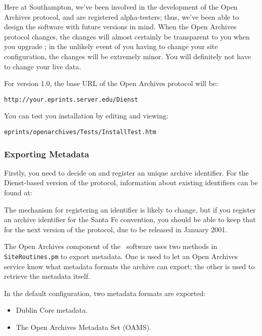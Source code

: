 Here at Southampton, we've been involved in the development of the Open Archives protocol, and are registered alpha-testers; thus, we've been able to design the software with future versions in mind. When the Open Archives protocol changes, the changes will almost certainly be transparent to you when you upgrade \eprints; in the unlikely event of you having to change your site configuration, the changes will be extremely minor. You will definitely not have to change your live data.

For version 1.0, the base URL of the Open Archives protocol will be:

\begin{verbatim}
http://your.eprints.server.edu/Dienst
\end{verbatim}

You can test you installation by editing and viewing:

\begin{verbatim}
eprints/openarchives/Tests/InstallTest.htm
\end{verbatim}


\subsubsection{Exporting Metadata}

Firstly, you need to decide on and register an unique archive identifier. For the Dienst-based version of the protocol, information about existing identifiers can be found at:


The mechanism for registering an identifier is likely to change, but if you register an archive identifier for the Santa Fe convention, you should be able to keep that for the next version of the protocol, due to be released in January 2001.

The Open Archives component of the \eprints\ software uses two methods in {\tt SiteRoutines.pm} to export metadata. One is used to let an Open Archives service know what metadata formats the archive can export; the other is used to retrieve the metadata itself.

In the default configuration, two metadata formats are exported:

\begin{itemize}
\item Dublin Core metadata.
\item The Open Archives Metadata Set (OAMS).
\end{itemize}

